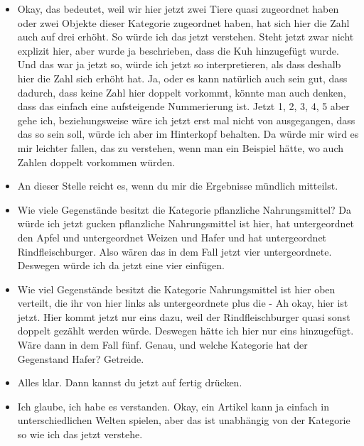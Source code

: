 {\begin{itemize}[]
    Also man kann Verknüpfungen auf unterschiedliche Arten herstellen.
    Eine Kategorie, welche sich unter Säugetiere einordnen lässt.
    Ich denke Fleischfressern. Ah okay, und das wird auch scheinbar so weitergereicht.
    Also oben ist jetzt hat sich jetzt die 2 in eine 3 verwandelt, obwohl es keine direkte Relation war, sondern eine indirekte Relation.
    \item {} Okay, das bedeutet, weil wir hier jetzt zwei Tiere quasi zugeordnet haben oder zwei Objekte dieser Kategorie zugeordnet haben, hat sich hier die Zahl auch auf drei erhöht.
    So würde ich das jetzt verstehen.
    Steht jetzt zwar nicht explizit hier, aber wurde ja beschrieben, dass die Kuh hinzugefügt wurde.
    Und das war ja jetzt so, würde ich jetzt so interpretieren, als dass deshalb hier die Zahl sich erhöht hat.
    Ja, oder es kann natürlich auch sein gut, dass dadurch, dass keine Zahl hier doppelt vorkommt, könnte man auch denken, dass das einfach eine aufsteigende Nummerierung ist.
    Jetzt 1, 2, 3, 4, 5 aber gehe ich, beziehungsweise wäre ich jetzt erst mal nicht von ausgegangen, dass das so sein soll, würde ich aber im Hinterkopf behalten.
    Da würde mir wird es mir leichter fallen, das zu verstehen, wenn man ein Beispiel hätte, wo auch Zahlen doppelt vorkommen würden.
    \item {} An dieser Stelle reicht es, wenn du mir die Ergebnisse mündlich mitteilst. 
    \item {} Wie viele Gegenstände besitzt die Kategorie pflanzliche Nahrungsmittel? Da würde ich jetzt gucken pflanzliche Nahrungsmittel ist hier, hat untergeordnet den Apfel und untergeordnet Weizen und Hafer und hat untergeordnet Rindfleischburger.
    Also wären das in dem Fall jetzt vier untergeordnete.
    Deswegen würde ich da jetzt eine vier einfügen.
    \item {} Wie viel Gegenstände besitzt die Kategorie Nahrungsmittel ist hier oben verteilt, die ihr von hier links als untergeordnete plus die - Ah okay, hier ist jetzt.
    Hier kommt jetzt nur eins dazu, weil der Rindfleischburger quasi sonst doppelt gezählt werden würde.
    Deswegen hätte ich hier nur eins hinzugefügt.
    Wäre dann in dem Fall fünf. 
    Genau, und welche Kategorie hat der Gegenstand Hafer? 
    Getreide.
    \item {} Alles klar.
    Dann kannst du jetzt auf fertig drücken.
    \item {} Ich glaube, ich habe es verstanden.
    Okay, ein Artikel kann ja einfach in unterschiedlichen Welten spielen, aber das ist unabhängig von der Kategorie so wie ich das jetzt verstehe.

\end{itemize}}
